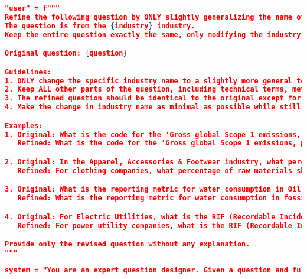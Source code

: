 \begin{appendices}
\begin{lstlisting}[language=json,firstnumber=1,label={lst:generalisation_prompt},caption={Generalisation function prompt}]
"user" = f"""
Refine the following question by ONLY slightly generalizing the name of the industry. 
The question is from the {industry} industry. 
Keep the entire question exactly the same, only modifying the industry name to be slightly more general.

Original question: {question}

Guidelines:
1. ONLY change the specific industry name to a slightly more general term.
2. Keep ALL other parts of the question, including technical terms, metrics, and structure, exactly the same.
3. The refined question should be identical to the original except for the industry name.
4. Make the change in industry name as minimal as possible while still generalizing slightly.

Examples:
1. Original: What is the code for the 'Gross global Scope 1 emissions, percentage covered under emissions-limiting regulations' metric in the Coal Operations industry?
   Refined: What is the code for the 'Gross global Scope 1 emissions, percentage covered under emissions-limiting regulations' metric in the industry about operating coal?

2. Original: In the Apparel, Accessories & Footwear industry, what percentage of raw materials should be third-party certified to environmental or social sustainability standards?
   Refined: For clothing companies, what percentage of raw materials should be third-party certified to environmental or social sustainability standards?

3. Original: What is the reporting metric for water consumption in Oil & Gas Exploration & Production operations?
   Refined: What is the reporting metric for water consumption in fossil fuel extraction operations?

4. Original: For Electric Utilities, what is the RIF (Recordable Incident Frequency) safety performance indicator?
   Refined: For power utility companies, what is the RIF (Recordable Incident Frequency) safety performance indicator?

Provide only the revised question without any explanation.
"""

\end{lstlisting}

\newpage
\begin{lstlisting}[language=json,firstnumber=1,label={lst:sba_prompt},caption={SBA check prompt}]
system = "You are an expert question designer. Given a question and full context, you check if it has one and only one correct option."


\end{lstlisting}
\end{appendices}
